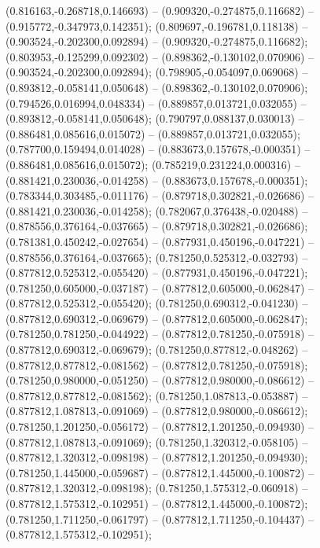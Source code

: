  (0.816163,-0.268718,0.146693) -- (0.909320,-0.274875,0.116682) -- (0.915772,-0.347973,0.142351);
 (0.809697,-0.196781,0.118138) -- (0.903524,-0.202300,0.092894) -- (0.909320,-0.274875,0.116682);
 (0.803953,-0.125299,0.092302) -- (0.898362,-0.130102,0.070906) -- (0.903524,-0.202300,0.092894);
 (0.798905,-0.054097,0.069068) -- (0.893812,-0.058141,0.050648) -- (0.898362,-0.130102,0.070906);
 (0.794526,0.016994,0.048334) -- (0.889857,0.013721,0.032055) -- (0.893812,-0.058141,0.050648);
 (0.790797,0.088137,0.030013) -- (0.886481,0.085616,0.015072) -- (0.889857,0.013721,0.032055);
 (0.787700,0.159494,0.014028) -- (0.883673,0.157678,-0.000351) -- (0.886481,0.085616,0.015072);
 (0.785219,0.231224,0.000316) -- (0.881421,0.230036,-0.014258) -- (0.883673,0.157678,-0.000351);
 (0.783344,0.303485,-0.011176) -- (0.879718,0.302821,-0.026686) -- (0.881421,0.230036,-0.014258);
 (0.782067,0.376438,-0.020488) -- (0.878556,0.376164,-0.037665) -- (0.879718,0.302821,-0.026686);
 (0.781381,0.450242,-0.027654) -- (0.877931,0.450196,-0.047221) -- (0.878556,0.376164,-0.037665);
 (0.781250,0.525312,-0.032793) -- (0.877812,0.525312,-0.055420) -- (0.877931,0.450196,-0.047221);
 (0.781250,0.605000,-0.037187) -- (0.877812,0.605000,-0.062847) -- (0.877812,0.525312,-0.055420);
 (0.781250,0.690312,-0.041230) -- (0.877812,0.690312,-0.069679) -- (0.877812,0.605000,-0.062847);
 (0.781250,0.781250,-0.044922) -- (0.877812,0.781250,-0.075918) -- (0.877812,0.690312,-0.069679);
 (0.781250,0.877812,-0.048262) -- (0.877812,0.877812,-0.081562) -- (0.877812,0.781250,-0.075918);
 (0.781250,0.980000,-0.051250) -- (0.877812,0.980000,-0.086612) -- (0.877812,0.877812,-0.081562);
 (0.781250,1.087813,-0.053887) -- (0.877812,1.087813,-0.091069) -- (0.877812,0.980000,-0.086612);
 (0.781250,1.201250,-0.056172) -- (0.877812,1.201250,-0.094930) -- (0.877812,1.087813,-0.091069);
 (0.781250,1.320312,-0.058105) -- (0.877812,1.320312,-0.098198) -- (0.877812,1.201250,-0.094930);
 (0.781250,1.445000,-0.059687) -- (0.877812,1.445000,-0.100872) -- (0.877812,1.320312,-0.098198);
 (0.781250,1.575312,-0.060918) -- (0.877812,1.575312,-0.102951) -- (0.877812,1.445000,-0.100872);
 (0.781250,1.711250,-0.061797) -- (0.877812,1.711250,-0.104437) -- (0.877812,1.575312,-0.102951);
